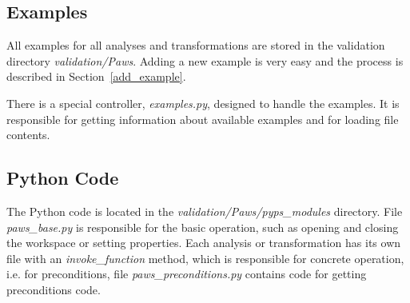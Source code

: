 \subsection{Examples}

All examples for all analyses and transformations are stored in the
validation directory \emph{validation/Paws}. Adding a new example is
very easy and the process is described in Section~\ref{add_example}.

There is a special controller, \emph{examples.py}, designed to handle the
examples. It is responsible for getting information about available
examples and for loading file contents.

\subsection{Python Code}

The Python code is located in the \emph{validation/Paws/pyps\_modules}
directory. File \emph{paws\_base.py} is responsible for the basic
operation, such as opening and closing the workspace or setting
properties. Each analysis or transformation has its own file with an
\emph{invoke\_function} method, which is responsible for concrete
operation, i.e. for preconditions, file \emph{paws\_preconditions.py}
contains code for getting preconditions code.
